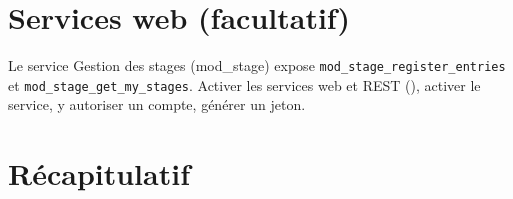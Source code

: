 \documentclass[11pt,a4paper]{article}
\begin{document}
\section{Services web (facultatif)}
\label{sec:ws}

Le service \og Gestion des stages (mod\_stage)\fg{} expose
\texttt{mod\_stage\_register\_entries} et \texttt{mod\_stage\_get\_my\_stages}.
Activer les services web et REST (), activer le service, y autoriser un compte, générer un jeton.


\section{Récapitulatif}
\end{document}
